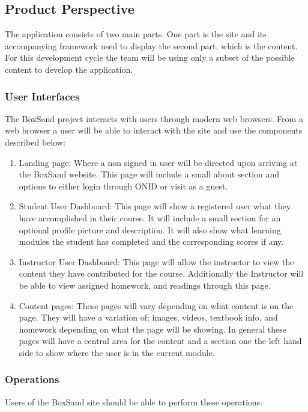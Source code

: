 \documentclass[onecolumn, draftclsnofoot,10pt, compsoc]{IEEEtran}
\begin{document}
\subsection{Product Perspective}
The application consists of two main parts. One part is the site and its accompanying framework used to display the second part, which is the content. For this development cycle the team will be using only a subset of the possible content to develop the application.

\subsubsection{User Interfaces}
The BoxSand project interacts with users through modern web browsers. From a web browser a user will be able to interact with the site and use the components described below: 
\begin{enumerate}
\item Landing page: Where a non signed in user will be directed upon arriving at the BoxSand website. This page will include a small about section and options to either login through ONID or visit as a guest.

\item Student User Dashboard: This page will show a registered user what they have accomplished in their course. It will include a small section for an optional profile picture and description. It will also show what learning modules the student has completed and the corresponding scores if any.

\item Instructor User Dashboard: This page will allow the instructor to view the content they have contributed for the course. Additionally the Instructor will be able to view assigned homework, and readings through this page.

\item Content pages: These pages will vary depending on what content is on the page. They will have a variation of: images, videos, textbook info, and homework depending on what the page will be showing. In general these pages will have a central area for the content and a section one the left hand side to show where the user is in the current module. 
\end{enumerate}

\subsubsection{Operations}
Users of the BoxSand site should be able to perform these operations:
\end{document}
